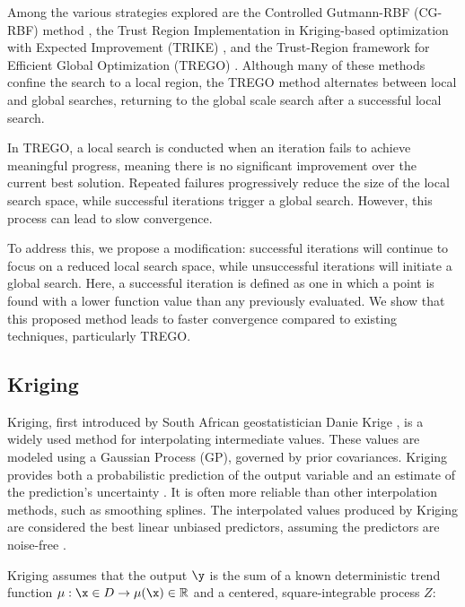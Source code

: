\documentclass [PhD] {package/uclathes}
\begin{document}
Among the various strategies explored are the Controlled Gutmann-RBF (CG-RBF) method \parencite{regis2007improved}, the Trust Region Implementation in Kriging-based optimization with Expected Improvement (TRIKE) \parencite{regis2016trust}, and the Trust-Region framework for Efficient Global Optimization (TREGO) \parencite{diouane2023trego}. Although many of these methods confine the search to a local region, the TREGO method alternates between local and global searches, returning to the global scale search after a successful local search.

In TREGO, a local search is conducted when an iteration fails to achieve meaningful progress, meaning there is no significant improvement over the current best solution. Repeated failures progressively reduce the size of the local search space, while successful iterations trigger a global search. However, this process can lead to slow convergence.

To address this, we propose a modification: successful iterations will continue to focus on a reduced local search space, while unsuccessful iterations will initiate a global search. Here, a successful iteration is defined as one in which a point is found with a lower function value than any previously evaluated. We show that this proposed method leads to faster convergence compared to existing techniques, particularly TREGO.

\iffalse %
\subsection{Kriging}

Kriging, first introduced by South African geostatistician Danie Krige \parencite{krige1951statistical}, is a widely used method for interpolating intermediate values. These values are modeled using a Gaussian Process (GP), governed by prior covariances. Kriging provides both a probabilistic prediction of the output variable and an estimate of the prediction's uncertainty \parencite{chevalier2014kriginv}. It is often more reliable than other interpolation methods, such as smoothing splines. The interpolated values produced by Kriging are considered the best linear unbiased predictors, assuming the predictors are noise-free \parencite{roustant2012dicekriging}.

Kriging assumes that the output \(\y\) is the sum of a known deterministic trend function \(\mu: \x \in D \rightarrow \mu(\x) \in \mathbb{R}\) and a centered, square-integrable process \(Z\):
\end{document}
